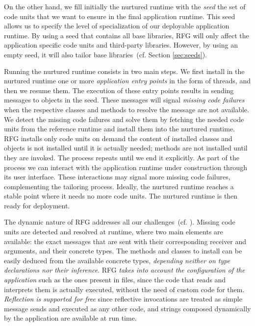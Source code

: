 On the other hand, we fill initially the nurtured runtime with the \emph{seed} \ie the set of code units that we want to ensure in the final application runtime. This seed allows us to specify the level of specialization of our deployable application runtime.
By using a seed that contains all base libraries, RFG will only affect the application specific code units and third-party libraries.
However, by using an empty seed, it will also tailor base libraries~(cf. Section \ref{sec:seeds}).

Running the nurtured runtime consists in two main steps. We first install in the nurtured runtime one or more \emph{application entry points} in the form of threads, and then we resume them.
The execution of these entry points results in sending messages to objects in the seed. These messages will signal \emph{missing code failures} when the respective classes and methods to resolve the message are not available.
We detect the missing code failures and solve them by fetching the needed code units from the reference runtime and install them into the nurtured runtime. RFG installs only code units on demand \ie the content of installed classes and objects is not installed until it is actually needed; methods are not installed until they are invoked.
The process repeats until we end it explicitly. As part of the process we can interact with the application runtime under construction through \eg its user interface. These interactions may signal more missing code failures, complementing the tailoring process. Ideally, the nurtured runtime reaches a stable point where it needs no more code units.
The nurtured runtime is then ready for deployment.

The dynamic nature of RFG addresses all our challenges~(cf. ). Missing code units are detected and resolved at runtime, where two main elements are available: the exact messages that are sent with their corresponding receiver and arguments, and their concrete types. The methods and classes to install can be easily deduced from the available concrete types, \emph{depending neither on type declarations nor their inference}. RFG \emph{takes into account the configuration of the application} such as the ones present in files, since the code that reads and interprets them is actually executed, without the need of custom code for them. \emph{Reflection is supported for free} since reflective invocations are treated as simple message sends and executed as any other code, and strings composed dynamically by the application are available at run time. 


